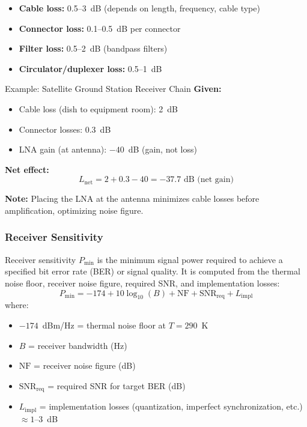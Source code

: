 \begin{itemize}
\item \textbf{Cable loss:} 0.5--3~dB (depends on length, frequency, cable type)
\item \textbf{Connector loss:} 0.1--0.5~dB per connector
\item \textbf{Filter loss:} 0.5--2~dB (bandpass filters)
\item \textbf{Circulator/duplexer loss:} 0.5--1~dB
\end{itemize}

\begin{calloutbox}{Example: Satellite Ground Station Receiver Chain}
\textbf{Given:}
\begin{itemize}
\item Cable loss (dish to equipment room): 2~dB
\item Connector losses: 0.3~dB
\item LNA gain (at antenna): $-40$~dB (gain, not loss)
\end{itemize}

\textbf{Net effect:}
\begin{equation*}
L_{\text{net}} = 2 + 0.3 - 40 = -37.7\text{~dB (net gain)}
\end{equation*}

\textbf{Note:} Placing the LNA at the antenna minimizes cable losses before amplification, optimizing noise figure.
\end{calloutbox}

\subsubsection{Receiver Sensitivity}

Receiver sensitivity $P_{\text{min}}$ is the minimum signal power required to achieve a specified bit error rate (BER) or signal quality. It is computed from the thermal noise floor, receiver noise figure, required SNR, and implementation losses:
\begin{equation}
P_{\text{min}} = -174 + 10\log_{10}(B) + \text{NF} + \text{SNR}_{\text{req}} + L_{\text{impl}}
\label{eq:receiver-sensitivity}
\end{equation}
where:
\begin{itemize}
\item $-174$~dBm/Hz = thermal noise floor at $T = 290$~K
\item $B$ = receiver bandwidth (Hz)
\item $\text{NF}$ = receiver noise figure (dB)
\item $\text{SNR}_{\text{req}}$ = required SNR for target BER (dB)
\item $L_{\text{impl}}$ = implementation losses (quantization, imperfect synchronization, etc.) $\approx 1$--3~dB
\end{itemize}

